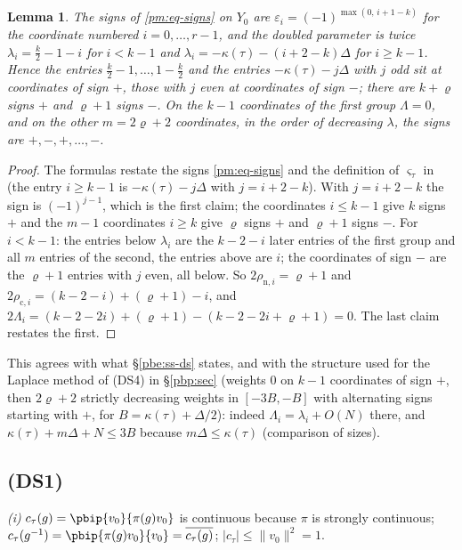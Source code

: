 \documentclass[10pt]{amsart}
\newtheorem{lemma}[theorem]{Lemma}
\theoremstyle{definition}
\theoremstyle{remark}
\providecommand{\aubar}[1]{\overline{#1}}
\begin{document}
\begin{lemma}\label{pds:chamber}
The signs of \eqref{pm:eq-signs} on $Y_0$ are $\varepsilon_i=(-1)^{\max(0,\,i+1-k)}$ for the
coordinate numbered $i=0,\dots,r-1$, and the doubled parameter is twice
$\lambda_i=\frac k2-1-i$ for $i<k-1$ and $\lambda_i=-\kappa(\tau)-(i+2-k)\Delta$ for $i\ge k-1$.
Hence the entries $\frac k2-1,\dots,1-\frac k2$ and the entries $-\kappa(\tau)-j\Delta$ with $j$ odd
sit at coordinates of sign $+$, those with $j$ even at coordinates of sign $-$; there are $k+\varrho$
signs $+$ and $\varrho+1$ signs $-$. On the $k-1$ coordinates of the first group $\Lambda=0$, and on
the other $m=2\varrho+2$ coordinates, in the order of decreasing $\lambda$, the signs are $+,-,+,
\dots,-$.
\end{lemma}
\begin{proof}
The formulas restate the signs \eqref{pm:eq-signs} and the definition of $\varsigma_\tau$ in
{\cite[\S14.3]{P46}} (the entry $i\ge k-1$ is $-\kappa(\tau)-j\Delta$ with $j=i+2-k$). With $j=i+2-k$
the sign is $(-1)^{j-1}$, which is the first claim;
the coordinates $i\le k-1$ give $k$ signs $+$ and the $m-1$ coordinates $i\ge k$ give $\varrho$
signs $+$ and $\varrho+1$ signs $-$. For $i<k-1$: the entries below $\lambda_i$ are the $k-2-i$
later entries of the first group and all $m$ entries of the second, the entries above are $i$; the
coordinates of sign $-$ are the $\varrho+1$ entries with $j$ even, all below. So $2\rho_{\mathrm n,i}
=\varrho+1$ and $2\rho_{\mathrm c,i}=(k-2-i)+(\varrho+1)-i$, and $2\Lambda_i=(k-2-2i)+(\varrho+1)-
(k-2-2i+\varrho+1)=0$. The last claim restates the first.
\end{proof}
This agrees with what \S\ref{pbe:ss-ds} states, and with the structure used for the
Laplace method of \textup{(DS4)} in \S\ref{pbp:sec} (weights $0$ on $k-1$ coordinates of sign $+$, then $2\varrho+2$
strictly decreasing weights in $[-3B,-B]$ with alternating signs starting with $+$, for
$B=\kappa(\tau)+\Delta/2$): indeed $\Lambda_i=\lambda_i+O(N)$ there, and $\kappa(\tau)+m\Delta+N\le
3B$ because $m\Delta\le\kappa(\tau)$ (comparison of sizes).

\subsection{(DS1)}\label{pds:ss-ds1}

\emph{(i)} $c_\tau(g)=\pbip{v_0}{\pi(g)v_0}$ is continuous because $\pi$ is strongly continuous;
$c_\tau(g^{-1})=\pbip{\pi(g)v_0}{v_0}=\aubar{c_\tau(g)}$; $|c_\tau|\le\|v_0\|^2=1$.
\end{document}
